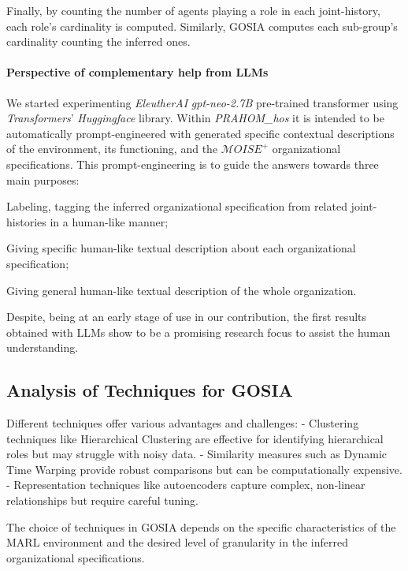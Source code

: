 \documentclass[sn-mathphys-num]{sn-jnl}%
\theoremstyle{thmstyleone}%
\theoremstyle{thmstyletwo}%
\theoremstyle{thmstylethree}%
\begin{document}
Finally, by counting the number of agents playing a role in each joint-history, each role's cardinality is computed. Similarly, GOSIA computes each sub-group's cardinality counting the inferred ones.

\paragraph{Perspective of complementary help from LLMs}

We started experimenting \emph{EleutherAI} \emph{gpt-neo-2.7B} pre-trained transformer using \emph{Transformers}' \emph{Huggingface} library. Within \emph{PRAHOM\_hos} it is intended to be automatically prompt-engineered with generated specific contextual descriptions of the environment, its functioning, and the $\mathcal{M}OISE^+$ organizational specifications. This prompt-engineering is to guide the answers towards three main purposes:
\begin{enumerate*}[label=\roman*),itemjoin={;\quad}]
    \item Labeling, tagging the inferred organizational specification from related joint-histories in a human-like manner;
    \item Giving specific human-like textual description about each organizational specification;
    \item Giving general human-like textual description of the whole organization.
\end{enumerate*}
Despite, being at an early stage of use in our contribution, the first results obtained with LLMs show to be a promising research focus to assist the human understanding.

\subsection{Analysis of Techniques for GOSIA}

Different techniques offer various advantages and challenges:
- Clustering techniques like Hierarchical Clustering are effective for identifying hierarchical roles but may struggle with noisy data.
- Similarity measures such as Dynamic Time Warping provide robust comparisons but can be computationally expensive.
- Representation techniques like autoencoders capture complex, non-linear relationships but require careful tuning.

The choice of techniques in GOSIA depends on the specific characteristics of the MARL environment and the desired level of granularity in the inferred organizational specifications.
\end{document}
